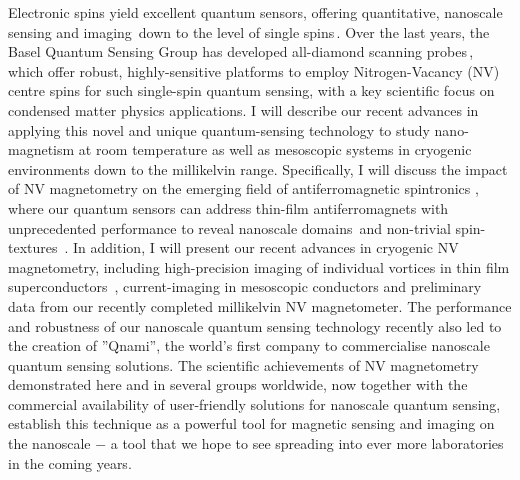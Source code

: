 Electronic spins yield excellent quantum sensors, offering quantitative, nanoscale sensing and imaging\,\cite{Rondin_2014} down to the level of single spins\,\cite{Grinolds_2013}. Over the last years, the Basel Quantum Sensing Group has developed all-diamond scanning probes\,\cite{Appel_2016,Maletinsky_2012}, which offer robust, highly-sensitive platforms to employ Nitrogen-Vacancy (NV) centre spins for such single-spin quantum sensing, with a key scientific focus on condensed matter physics applications. I will describe our recent advances in applying this novel and unique quantum-sensing technology to study nano-magnetism at room temperature as well as mesoscopic systems in cryogenic environments down to the millikelvin range. 
Specifically, I will discuss the impact of NV magnetometry on the emerging field of antiferromagnetic spintronics \cite{Jungwirth_2016}, where our quantum sensors can address thin-film antiferromagnets with unprecedented performance to reveal nanoscale domains\,\cite{Kosub_2017} and non-trivial spin-textures \,\cite{Gross_2017}. In addition, I will present our recent advances in cryogenic NV magnetometry, including high-precision imaging of individual vortices in thin film superconductors \,\cite{Thiel_2016}, current-imaging in mesoscopic conductors and preliminary data from our recently completed millikelvin NV magnetometer. 
The performance and robustness of our nanoscale quantum sensing technology recently also led to the creation of ''Qnami'', the world's first company to commercialise nanoscale quantum sensing solutions. The scientific achievements of NV magnetometry demonstrated here and in several groups worldwide, now together with the commercial availability of user-friendly solutions for nanoscale quantum sensing, establish this technique as a powerful tool for magnetic sensing and imaging on the nanoscale $-$ a tool that we hope to see spreading into ever more laboratories in the coming years.